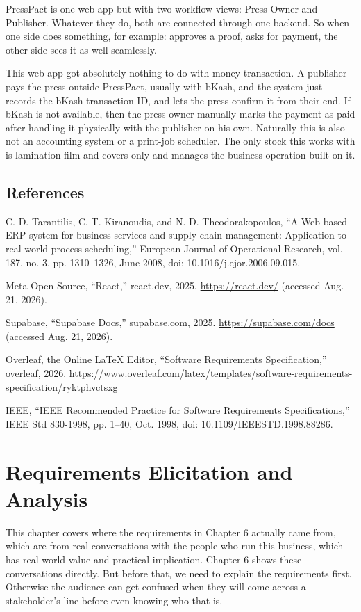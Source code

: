 \documentclass{scrreprt}
\begin{document}
PressPact is one web-app but with two workflow views: Press Owner and Publisher. Whatever they do, both are connected through one backend. So when one side does something, for example: approves a proof, asks for payment, the other side sees it as well seamlessly.

This web-app got absolutely nothing to do with money transaction. A publisher pays the press outside PressPact, usually with bKash, and the system just records the bKash transaction ID, and lets the press confirm it from their end. If bKash is not available, then the press owner manually marks the payment as paid after handling it physically with the publisher on his own. Naturally this is also not an accounting system or a print-job scheduler. The only stock this works with is lamination film and covers only and manages the business operation built on it.

\section{References}
\begin{enumerate}[label={[\arabic*]}]
\item C. D. Tarantilis, C. T. Kiranoudis, and N. D. Theodorakopoulos, ``A Web-based ERP system for business services and supply chain management: Application to real-world process scheduling,'' European Journal of Operational Research, vol. 187, no. 3, pp. 1310--1326, June 2008, doi: 10.1016/j.ejor.2006.09.015.
\item Meta Open Source, ``React,'' react.dev, 2025. \url{https://react.dev/} (accessed Aug. 21, 2026).
\item Supabase, ``Supabase Docs,'' supabase.com, 2025. \url{https://supabase.com/docs} (accessed Aug. 21, 2026).
\item Overleaf, the Online LaTeX Editor, ``Software Requirements Specification,'' overleaf, 2026. \url{https://www.overleaf.com/latex/templates/software-requirements-specification/ryktphvctsxg}
\item IEEE, ``IEEE Recommended Practice for Software Requirements Specifications,'' IEEE Std 830-1998, pp. 1--40, Oct. 1998, doi: 10.1109/IEEESTD.1998.88286.
\end{enumerate}

\chapter{Requirements Elicitation and Analysis}
This chapter covers where the requirements in Chapter 6 actually came from, which are from real conversations with the people who run this business, which has real-world value and practical implication. Chapter 6 shows these conversations directly. But before that, we need to explain the requirements first. Otherwise the audience can get confused when they will come across a stakeholder's line before even knowing who that is.
\end{document}
